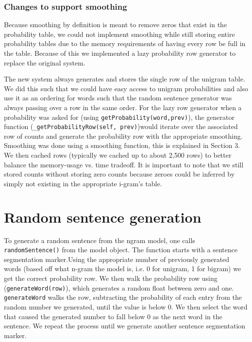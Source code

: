 \documentclass{article}
\begin{document}
\subsubsection{Changes to support smoothing}
Because smoothing by definition is meant to remove zeros that exist in the probability table, we could not implement smoothing while still storing entire probability tables due to the memory requirements of having every row be full in the table. Because of this we implemented a lazy probability row generator to replace the original system.

The new system always generates and stores the single row of the unigram table. We did this such that we could have easy access to unigram probabilities and also use it as an ordering for words such that the random sentence generator was always passing over a row in the same order. For the lazy row generator when a probability was asked for (using \texttt{getProbability(word,prev)}), the generator function (\texttt{\_getProbabilityRow(self, prev)})would iterate over the associated row of counts and generate the probability row with the appropriate smoothing. Smoothing was done using a smoothing function, this is explained in Section 3. We then cached rows (typically we cached up to about 2,500 rows) to better balance the memory-usage vs. time tradeoff. It is important to note that we still stored counts without storing zero counts because zeroes could be inferred by simply not existing in the appropriate i-gram's table.

\section{Random sentence generation}
To generate a random sentence from the ngram model, one calls \texttt{randomSentence()} from the model object. The function starts with a sentence segmentation marker.Using the appropriate number of previously generated words (based off what n-gram the model is, i.e. 0 for unigram, 1 for bigram) we get the correct probability row. We then walk the probability row using (\texttt{generateWord(row)}), which generates a random float between zero and one. \texttt{generateWord} walks the row, subtracting the probability of each entry from the random number we generated, until the value is below 0. We then select the word that caused the generated number to fall below 0 as the next word in the sentence. We repeat the process until we generate another sentence segmentation marker.

\iffalse
\end{document}
